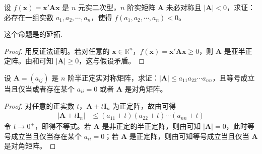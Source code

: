 \documentclass[../../main.tex]{subfiles}
\begin{document}
\begin{proposition}\label{proposition:对应矩阵的行列式小于零的二次型必存在小于零的一点}
设 \(f(\boldsymbol{x})=\boldsymbol{x}'\boldsymbol{A}\boldsymbol{x}\) 是 \(n\) 元实二次型，\(n\) 阶实矩阵 \(\boldsymbol{A}\) 未必对称且 \(|\boldsymbol{A}|<0\)，求证：必存在一组实数 \(a_1,a_2,\cdots,a_n\)，使得 \(f(a_1,a_2,\cdots,a_n)<0\)。
\end{proposition}
\begin{remark}
这个命题是的延拓.
\end{remark}
\begin{proof}
用反证法证明。若对任意的 \(\boldsymbol{x}\in\mathbb{R}^n\)，\(f(\boldsymbol{x})=\boldsymbol{x}'\boldsymbol{A}\boldsymbol{x}\geqslant 0\)，则 \(\boldsymbol{A}\) 是亚半正定阵。由和可知 \(|\boldsymbol{A}|\geqslant 0\)，这与假设矛盾。
\end{proof}

\begin{proposition}\label{proposition:半正定阵行列式与主对角乘积的不等式}
设 \(\boldsymbol{A}=(a_{ij})\) 是 \(n\) 阶半正定实对称矩阵，求证：\(|\boldsymbol{A}|\leqslant  a_{11}a_{22}\cdots a_{nn}\)，且等号成立当且仅当或者存在某个 \(a_{ii}=0\) 或者 \(\boldsymbol{A}\) 是对角矩阵。 
\end{proposition}
\begin{proof}
对任意的正实数 \(t\)，\(\boldsymbol{A}+t\boldsymbol{I}_n\) 为正定阵，故由可得
\begin{align*}
|\boldsymbol{A}+t\boldsymbol{I}_n|&\leqslant (a_{11}+t)(a_{22}+t)\cdots(a_{nn}+t)
\end{align*}
令 \(t\to0^+\)，即得不等式。若 \(\boldsymbol{A}\) 是非正定的半正定阵，则由可知 \(|\boldsymbol{A}| = 0\)，此时等号成立当且仅当存在某个 \(a_{ii}=0\)；若 \(\boldsymbol{A}\) 是正定阵，则由可知等号成立当且仅当 \(\boldsymbol{A}\) 是对角矩阵。
\end{proof}
\end{document}
